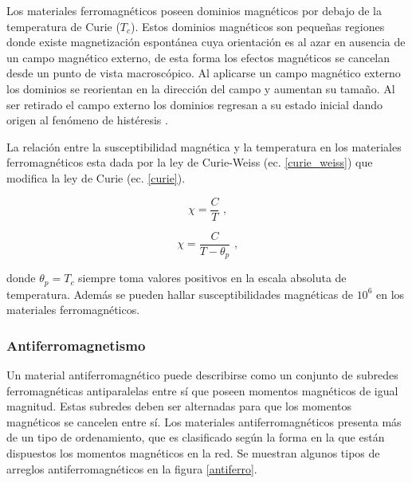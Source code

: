 \noindent Los materiales ferromagn\'eticos poseen dominios magn\'eticos por debajo de la temperatura de Curie ($T_{c}$). Estos dominios magn\'eticos son peque\~nas regiones donde existe magnetizaci\'on espont\'anea cuya orientaci\'on es al azar en ausencia de un campo magn\'etico externo, de esta forma los efectos magn\'eticos se cancelan desde un punto de vista macrosc\'opico. Al aplicarse un campo magn\'etico externo los dominios se reorientan en la direcci\'on del campo y aumentan su tama\~no. Al ser retirado el campo externo los dominios regresan a su estado inicial dando origen al fen\'omeno de hist\'eresis \cite{kimura2003}.

\noindent La relaci\'on entre la susceptibilidad magn\'etica y la
temperatura en los materiales ferromagn\'eticos esta dada por la ley de Curie-Weiss (ec. \ref{curie_weiss}) que modifica la ley de Curie (ec. \ref{curie}).


\begin{equation}
\chi = \frac{C}{T}
\label{curie} \textrm{ ,}
\end{equation}

\begin{equation}
\chi = \frac{C}{T-\theta _{p}}
\label{curie_weiss} \textrm{ ,}
\end{equation}

\noindent donde $\theta _{p} = T_{c}$ siempre toma valores positivos en la 
escala absoluta de temperatura. Adem\'as se pueden hallar susceptibilidades magn\'eticas de $10^{6}$ en los materiales ferromagn\'eticos.

\subsubsection{Antiferromagnetismo}

Un material antiferromagn\'etico puede describirse como un conjunto de subredes ferromagn\'eticas antiparalelas entre s\'i que poseen momentos magn\'eticos de igual magnitud. Estas subredes deben ser alternadas para que los momentos magn\'eticos se cancelen entre s\'i. Los materiales antiferromagn\'eticos presenta m\'as de un tipo de ordenamiento, que es clasificado seg\'un la forma en la que est\'an dispuestos los momentos magn\'eticos en la 
red. Se muestran algunos tipos de arreglos antiferromagn\'eticos en la figura \ref{antiferro}.


